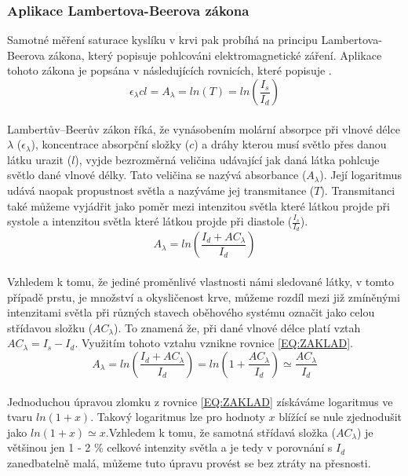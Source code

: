 \subsubsection{Aplikace Lambertova-Beerova zákona} Samotné měření saturace kyslíku v krvi pak probíhá na principu Lambertova-Beerova zákona, který popisuje pohlcováni elektromagnetické záření. Aplikace tohoto zákona je popsána v následujících rovnicích, které popisuje \cite{KYRIACOU}.
\begin{equation}
  {\epsilon_{\lambda}cl} = A_{\lambda} = ln(T) = ln(\frac{I_s}{I_d})
  \label{EQ:Lambertův–Beerův zákon}
\end{equation}\\
Lambertův–Beerův zákon říká, že vynásobením molární absorpce při vlnové délce $\lambda$ ($\epsilon_{\lambda}$), koncentrace absorpční složky ($c$) a dráhy kterou musí světlo přes danou látku urazit ($l$), vyjde bezrozměrná veličina udávající jak daná látka pohlcuje světlo dané vlnové délky. Tato veličina se nazývá absorbance ($A_{\lambda}$). Její logaritmus udává naopak propustnost světla a nazýváme jej transmitance ($T$). Transmitanci také můžeme vyjádřit jako poměr mezi intenzitou světla které látkou projde při systole a intenzitou světla které látkou projde při diastole ($\frac{I_s}{I_d}$).\\
\begin{equation}
    A_{\lambda} = ln(\frac{I_d+AC_{\lambda}}{I_d})
    \label{EQ:ZAKLAD}
\end{equation}\\
Vzhledem k tomu, že jediné proměnlivé vlastnosti námi sledované látky, v tomto případě prstu, je množství a okysličenost krve, můžeme rozdíl mezi již zmíněnými intenzitami světla při různých stavech oběhového systému označit jako celou střídavou složku ($AC_{\lambda}$). To znamená že, při dané vlnové délce platí vztah $AC_{\lambda} = I_s - I_d$. Využitím tohoto vztahu vznikne rovnice \ref{EQ:ZAKLAD}.\\
\begin{equation}
    A_{\lambda} = ln(\frac{I_d+AC_{\lambda}}{I_d}) = ln(1+\frac{AC_{\lambda}}{I_d}) \simeq \frac{AC_{\lambda}}{I_d}
\end{equation}\\
Jednoduchou úpravou zlomku z rovnice \ref{EQ:ZAKLAD} získáváme logaritmus ve tvaru $ln(1+x)$. Takový logaritmus lze pro hodnoty $x$ blížící se nule zjednodušit jako $ln(1+x)\simeq x$.Vzhledem k tomu, že samotná střídavá složka ($AC_{\lambda}$) je většinou jen 1 - 2 \% celkové intenzity světla a je tedy v porovnání s $I_d$ zanedbatelně malá, můžeme tuto úpravu provést se bez ztráty na přesnosti.\\
